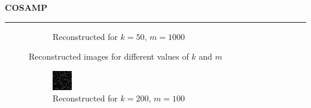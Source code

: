 \documentclass[a4paper,12pt]{article}
\newenvironment{solution}[2][]{%
    \begin{mdframed}[linecolor=blue!70!black, linewidth=2pt, roundcorner=10pt, backgroundcolor=yellow!10!white, skipabove=12pt, skipbelow=12pt]%
        \textbf{\large #2}
        \par\noindent\rule{\textwidth}{0.4pt}
}{
    \end{mdframed}
}
\begin{document}
\begin{solution}{COSAMP}
\begin{figure}[H]
\begin{subfigure}[t]{0.23\textwidth}
            \caption{Reconstructed for $k = 50$, $m = 1000$}
        \end{subfigure}
      \caption{Reconstructed images for different values of $k$ and $m$}
      \label{fig:reconstructed_all}
    \end{figure}
    
    \begin{figure}[H]
        \centering
      \begin{subfigure}[t]{0.23\textwidth}
          \centering
          \includegraphics[width=\textwidth]{../images/cosamp/Reconstructed_k_200_m_100.png}
          \caption{Reconstructed for $k = 200$, $m = 100$}
      \end{subfigure}
        \begin{subfigure}[t]{0.23\textwidth}
            \centering

\end{subfigure}
\end{figure}
\end{solution}
\end{document}
